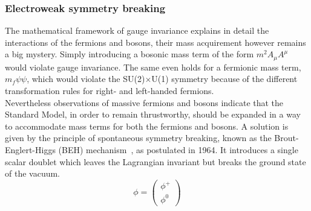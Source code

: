 \subsubsection{Electroweak symmetry breaking} \label{sec::EWSB}
The mathematical framework of gauge invariance explains in detail the interactions of the fermions and bosons, their mass acquirement however remains a big mystery. Simply introducing a bosonic mass term of the form $m^{2} A_{\mu}A^{\mu}$ would violate gauge invariance.
The same even holds for a fermionic mass term, $m_{f} \psi \psi$, which would violate the SU(2)$\times$U(1) symmetry because of the different transformation rules for right- and left-handed fermions.
\\
Nevertheless observations of massive fermions and bosons indicate that the Standard Model, in order to remain thrustworthy, should be expanded in a way to accommodate mass terms for both the fermions and bosons.
A solution is given by the principle of spontaneous symmetry breaking, known as the Brout-Englert-Higgs (BEH) mechanism~\cite{Englert, Higgs, Kibble}, as postulated in 1964.
It introduces a single scalar doublet which leaves the Lagrangian invariant but breaks the ground state of the vacuum.
\begin{equation}
 \phi = \begin{pmatrix}
            \phi^{+} \\
            \phi^{0}
           \end{pmatrix}
\end{equation}
